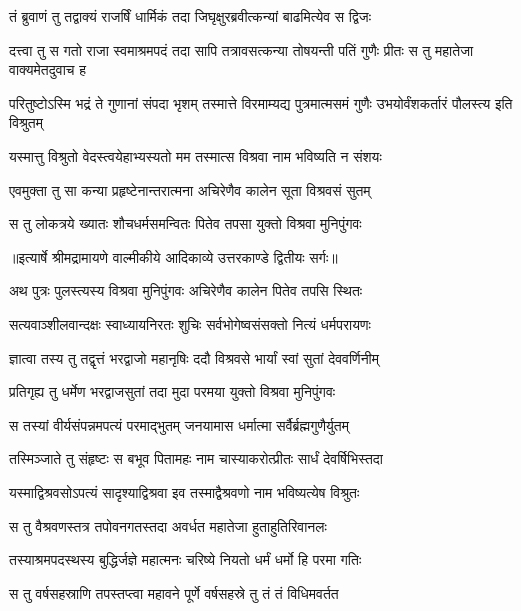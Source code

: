 \twolineshloka
{तं ब्रुवाणं तु तद्वाक्यं राजर्षिं धार्मिकं तदा}
{जिघृक्षुरब्रवीत्कन्यां बाढमित्येव स द्विजः} %

\threelineshloka
{दत्त्वा तु स गतो राजा स्वमाश्रमपदं तदा}
{सापि तत्रावसत्कन्या तोषयन्ती पतिं गुणैः}
{प्रीतः स तु महातेजा वाक्यमेतदुवाच ह} %

\threelineshloka
{परितुष्टोऽस्मि भद्रं ते गुणानां संपदा भृशम्}
{तस्मात्ते विरमाम्यद्य पुत्रमात्मसमं गुणैः}
{उभयोर्वंशकर्तारं पौलस्त्य इति विश्रुतम्} %

\twolineshloka
{यस्मात्तु विश्रुतो वेदस्त्वयेहाभ्यस्यतो मम}
{तस्मात्स विश्रवा नाम भविष्यति न संशयः} %

\twolineshloka
{एवमुक्ता तु सा कन्या प्रहृष्टेनान्तरात्मना}
{अचिरेणैव कालेन सूता विश्रवसं सुतम्} %

\twolineshloka
{स तु लोकत्रये ख्यातः शौचधर्मसमन्वितः}
{पितेव तपसा युक्तो विश्रवा मुनिपुंगवः} %


{॥इत्यार्षे श्रीमद्रामायणे वाल्मीकीये आदिकाव्ये उत्तरकाण्डे द्वितीयः सर्गः॥}


\twolineshloka
{अथ पुत्रः पुलस्त्यस्य विश्रवा मुनिपुंगवः}
{अचिरेणैव कालेन पितेव तपसि स्थितः} %

\twolineshloka
{सत्यवाञ्शीलवान्दक्षः स्वाध्यायनिरतः शुचिः}
{सर्वभोगेष्वसंसक्तो नित्यं धर्मपरायणः} %

\twolineshloka
{ज्ञात्वा तस्य तु तद्वृत्तं भरद्वाजो महानृषिः}
{ददौ विश्रवसे भार्यां स्वां सुतां देववर्णिनीम्} %

\twolineshloka
{प्रतिगृह्य तु धर्मेण भरद्वाजसुतां तदा}
{मुदा परमया युक्तो विश्रवा मुनिपुंगवः} %

\twolineshloka
{स तस्यां वीर्यसंपन्नमपत्यं परमाद्भुतम्}
{जनयामास धर्मात्मा सर्वैर्ब्रह्मगुणैर्युतम्} %

\twolineshloka
{तस्मिञ्जाते तु संहृष्टः स बभूव पितामहः}
{नाम चास्याकरोत्प्रीतः सार्धं देवर्षिभिस्तदा} %

\twolineshloka
{यस्माद्विश्रवसोऽपत्यं सादृश्याद्विश्रवा इव}
{तस्माद्वैश्रवणो नाम भविष्यत्येष विश्रुतः} %

\twolineshloka
{स तु वैश्रवणस्तत्र तपोवनगतस्तदा}
{अवर्धत महातेजा हुताहुतिरिवानलः} %

\twolineshloka
{तस्याश्रमपदस्थस्य बुद्धिर्जज्ञे महात्मनः}
{चरिष्ये नियतो धर्मं धर्मो हि परमा गतिः} %

\twolineshloka
{स तु वर्षसहस्राणि तपस्तप्त्वा महावने}
{पूर्णे वर्षसहस्रे तु तं तं विधिमवर्तत} %

